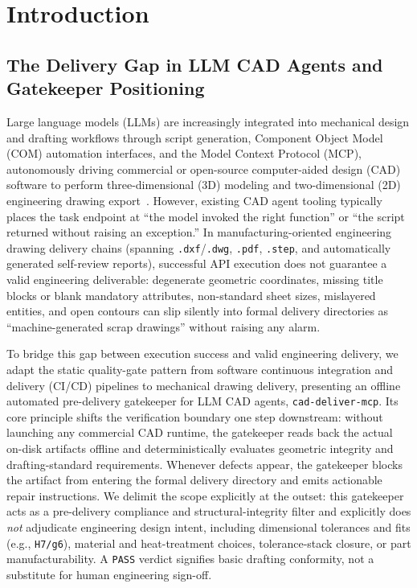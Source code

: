 \documentclass[nocopyright,nolists,upint,varvw,hyphenate]{asmejour}
\begin{document}
\date{}

\AbstractSep{5.5mm}
\maketitle

\section{Introduction}\label{sec:intro}

\subsection{The Delivery Gap in LLM CAD Agents and Gatekeeper Positioning}

Large language models (LLMs) are increasingly integrated into mechanical design and drafting workflows through script generation, Component Object Model (COM) automation interfaces, and the Model Context Protocol (MCP), autonomously driving commercial or open-source computer-aided design (CAD) software to perform three-dimensional (3D) modeling and two-dimensional (2D) engineering drawing export~\cite{zhang2026llm,khan2024text2cad,mallis2024cadassistant}. However, existing CAD agent tooling typically places the task endpoint at ``the model invoked the right function'' or ``the script returned without raising an exception.'' In manufacturing-oriented engineering drawing delivery chains (spanning \texttt{.dxf}/\texttt{.dwg}, \texttt{.pdf}, \texttt{.step}, and automatically generated self-review reports), successful API execution does not guarantee a valid engineering deliverable: degenerate geometric coordinates, missing title blocks or blank mandatory attributes, non-standard sheet sizes, mislayered entities, and open contours can slip silently into formal delivery directories as ``machine-generated scrap drawings'' without raising any alarm.

To bridge this gap between execution success and valid engineering delivery, we adapt the static quality-gate pattern from software continuous integration and delivery (CI/CD) pipelines to mechanical drawing delivery, presenting an offline automated pre-delivery gatekeeper for LLM CAD agents, \texttt{cad-deliver-mcp}. Its core principle shifts the verification boundary one step downstream: without launching any commercial CAD runtime, the gatekeeper reads back the actual on-disk artifacts offline and deterministically evaluates geometric integrity and drafting-standard requirements. Whenever defects appear, the gatekeeper blocks the artifact from entering the formal delivery directory and emits actionable repair instructions. We delimit the scope explicitly at the outset: this gatekeeper acts as a pre-delivery compliance and structural-integrity filter and explicitly does \emph{not} adjudicate engineering design intent, including dimensional tolerances and fits (e.g., \texttt{H7/g6}), material and heat-treatment choices, tolerance-stack closure, or part manufacturability. A \texttt{PASS} verdict signifies basic drafting conformity, not a substitute for human engineering sign-off.
\end{document}
